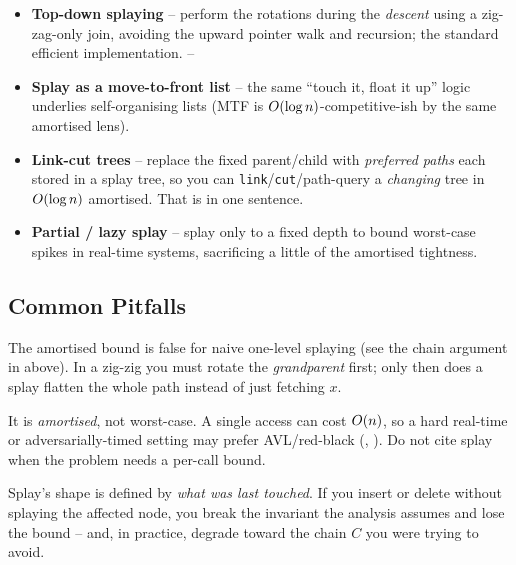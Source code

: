 \begin{itemize}[nosep, leftmargin=1.4em]
  \item \textbf{Top-down splaying} -- perform the rotations during the \emph{descent} using a zig-zag-only
        join, avoiding the upward pointer walk and recursion; the standard efficient implementation. \hfill{}--
  \item \textbf{Splay as a move-to-front list} -- the same ``touch it, float it up'' logic underlies
        self-organising lists (MTF is $O(\log n)$-competitive-ish by the same amortised lens). \hfill{}
  \item \textbf{Link-cut trees} -- replace the fixed parent/child with \emph{preferred paths} each stored in
        a splay tree, so you can \texttt{link}/\texttt{cut}/path-query a \emph{changing} tree in
        $O(\log n)$ amortised. That is  in one sentence. \hfill{}
  \item \textbf{Partial / lazy splay} -- splay only to a fixed depth to bound worst-case spikes in
        real-time systems, sacrificing a little of the amortised tightness. \hfill{}
\end{itemize}

\subsection{Common Pitfalls}\label{sec:c06-splay-pitfalls}

\begin{warningbox}
The amortised bound  is false for naive one-level splaying (see the chain argument in
 above). In a zig-zig you must rotate the \emph{grandparent} first; only then does a
splay flatten the whole path instead of just fetching $x$.
\end{warningbox}

\begin{warningbox}
It is \emph{amortised}, not worst-case. A single access can cost $O(n)$, so a hard real-time or
adversarially-timed setting may prefer AVL/red-black (, ). Do
not cite splay when the problem needs a per-call bound.
\end{warningbox}

\begin{warningbox}
Splay's shape is defined by \emph{what was last touched}. If you insert or delete without splaying the
affected node, you break the invariant the analysis assumes and lose the bound -- and, in practice,
degrade toward the chain $C$ you were trying to avoid.
\end{warningbox}

